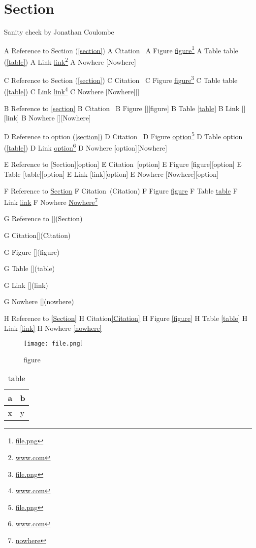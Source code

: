 
\def\mytitle{MultiMarkdown Sanity Test}


\part{Section}
\label{section}

Sanity check by Jonathan Coulombe

A Reference to Section (\autoref{section})
A Citation~\citep{Citation}
A Figure \href{file.png}{figure}\footnote{\href{file.png}{file.png}}
A Table table (\autoref{table})
A Link \href{www.com}{link}\footnote{\href{www.com}{www.com}}
A Nowhere [Nowhere]

C Reference to Section (\autoref{section})
C Citation~\citep{Citation}
C Figure \href{file.png}{figure}\footnote{\href{file.png}{file.png}}
C Table table (\autoref{table})
C Link \href{www.com}{link}\footnote{\href{www.com}{www.com}}
C Nowhere [Nowhere][]

B Reference to \autoref{section}
B Citation~\citep{Citation}
B Figure [][figure]
B Table \autoref{table}
B Link [][link]
B Nowhere [][Nowhere]

D Reference to option (\autoref{section})
D Citation~\citep[option]{Citation}
D Figure \href{file.png}{option}\footnote{\href{file.png}{file.png}}
D Table option (\autoref{table})
D Link \href{www.com}{option}\footnote{\href{www.com}{www.com}}
D Nowhere [option][Nowhere]

E Reference to [Section][option]
E Citation~\citep{Citation}[option]
E Figure [figure][option]
E Table [table][option]
E Link [link][option]
E Nowhere [Nowhere][option]

F Reference to \href{Section}{Section}
F Citation~\citep{Citation}(Citation)
F Figure \href{figure}{figure}
F Table \href{table}{table}
F Link \href{link}{link}
F Nowhere \href{nowhere}{Nowhere}\footnote{\href{nowhere}{nowhere}}

G Reference to [](Section)

G Citation[](Citation)

G Figure [](figure)

G Table [](table)

G Link [](link)

G Nowhere [](nowhere)

H Reference to \autoref{Section}
H Citation\autoref{Citation}
H Figure \autoref{figure}
H Table \autoref{table}
H Link \autoref{link}
H Nowhere \autoref{nowhere}

\begin{figure}[htbp]
\centering
\texttt{[image: file.png]}
\caption{figure}
\label{figure}
\end{figure}

\begin{table}[htbp]
\begin{minipage}{\linewidth}
\setlength{\tymax}{0.5\linewidth}
\centering
\small
\caption{table}
\label{table}
\begin{tabulary}{\textwidth}{@{}LL@{}} \toprule
a&b\\
\midrule
x&y\\

\bottomrule

\end{tabulary}
\end{minipage}
\end{table}




